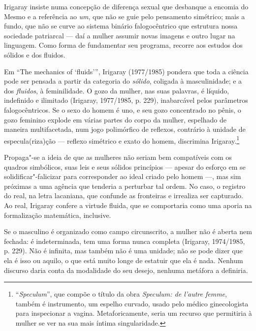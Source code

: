 Irigaray insiste numa concepção de diferença sexual que desbanque a
encomia do Mesmo e a referência ao \emph{um}, que não se guie pelo
pensamento simétrico; mais a fundo, que não se curve ao sistema binário
falogocêntrico que estrutura nossa sociedade patriarcal --- daí a mulher
assumir novas imagens e outro lugar na linguagem. Como forma de
fundamentar seu programa, recorre aos estudos dos sólidos e dos fluidos.

Em ``The mechanics of `fluids''', Irigaray (1977/1985) pondera que toda
a ciência pode ser pensada a partir da categoria do \emph{sólido},
coligada à masculinidade; e a dos \emph{fluidos}, à feminilidade. O gozo
da mulher, nas suas palavras, é líquido, indefinido e ilimitado
(Irigaray, 1977/1985, p. 229), inabarcável pelos parâmetros
falogocêntricos. Se o sexo do homem é uno, e seu gozo concentrado no
pênis, o gozo feminino explode em várias partes do corpo da mulher,
espelhado de maneira multifacetada, num jogo polimórfico de reflexos,
contrário à unidade de especula(riza)ção --- reflexo simétrico e exato
do homem, discrimina Irigaray.\footnote{``\emph{Speculum}'', que compõe o
  título da obra \emph{Speculum: de l'autre femme}, também é
  instrumento, um espelho curvado, usado pelo médico ginecologista para
  inspecionar a vagina. Metaforicamente, seria um recurso que permitiria
  à mulher se ver na sua mais íntima singularidade.}

Propaga"-se a ideia de que as mulheres não seriam bem compatíveis com os
quadros simbólicos, suas leis e seus sólidos princípios --- apesar do
esforço em se solidificar"-falicizar para corresponder ao ideal criado
pelo homem ---, mas sim próximas a uma agência que tenderia a perturbar
tal ordem. No caso, o registro do real, na letra lacaniana, que confunde
as fronteiras e irrealiza ser capturado. Ao real, Irigaray confere a
virtude fluida, que se comportaria como uma aporia na formalização
matemática, inclusive.

Se o masculino é organizado como campo circunscrito, a mulher não é
aberta nem fechada: é indeterminada, tem uma forma nunca completa
(Irigaray, 1974/1985, p. 229). Não é infinita, mas também não é uma
unidade; não se pode dizer que ela é isso ou aquilo, o que está muito
longe de estatuir que ela é nada. Nenhum discurso daria conta da
modalidade do seu desejo, nenhuma metáfora a definiria.

